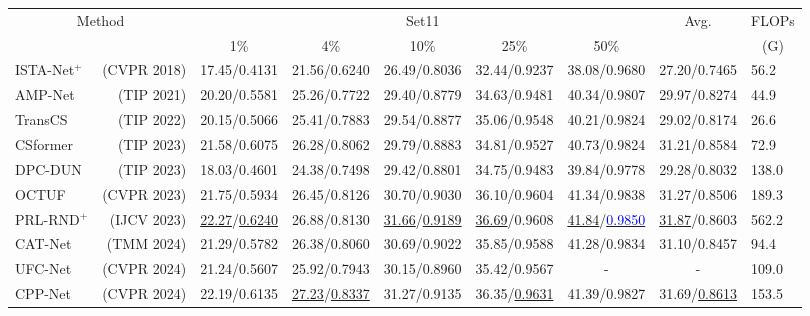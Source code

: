 \documentclass[10pt,twocolumn,letterpaper]{article}
\begin{document}
\begin{table}[th]
	\centering
	\begin{adjustbox}{width=\linewidth,center}
		\begin{tabular}{@{}lrccccccl@{}}
			\toprule
			\multicolumn{2}{c}{\multirow{2}{*}{Method}} & \multicolumn{5}{c}{Set11\cite{kulkarni2016reconnet}} & \multirow{2}{*}{Avg.} & \multicolumn{1}{c}{FLOPs} \\ \cmidrule(lr){3-7}
			\multicolumn{2}{c}{} & 1\% & 4\% & 10\% & 25\% & 50\% &  & \multicolumn{1}{c}{(G)} \\ \midrule
			ISTA-Net$^+$\cite{zhang2018ista} & (CVPR 2018) & 17.45/0.4131 & 21.56/0.6240 & 26.49/0.8036 & 32.44/0.9237 & 38.08/0.9680 & 27.20/0.7465 & 56.2 \\
			AMP-Net\cite{zhang2020amp} & (TIP 2021) & 20.20/0.5581 & 25.26/0.7722 & 29.40/0.8779 & 34.63/0.9481 & 40.34/0.9807 & 29.97/0.8274 & 44.9 \\
			TransCS\cite{shen2022transcs} & (TIP 2022) & 20.15/0.5066 & 25.41/0.7883 & 29.54/0.8877 & 35.06/0.9548 & 40.21/0.9824 & 29.02/0.8174 & 26.6 \\
			CSformer\cite{ye2021csformer} & (TIP 2023) & 21.58/0.6075 & 26.28/0.8062 & 29.79/0.8883 & 34.81/0.9527 & 40.73/0.9824 & 31.21/0.8584 & 72.9 \\
			DPC-DUN\cite{DBLP:journals/tip/SongCZ23} & (TIP 2023) & 18.03/0.4601 & 24.38/0.7498 & 29.42/0.8801 & 34.75/0.9483 & 39.84/0.9778 & 29.28/0.8032 & 138.0 \\
			OCTUF\cite{Song2023OptimizationInspiredCT} & (CVPR 2023) & 21.75/0.5934 & 26.45/0.8126 & 30.70/0.9030 & 36.10/0.9604 & 41.34/0.9838 & 31.27/0.8506 & 189.3 \\
			PRL-RND$^+$\cite{DBLP:journals/ijcv/ChenSXZ23} & (IJCV 2023) & \underline{22.27}/\underline{0.6240} & 26.88/0.8130 & \underline{31.66}/\underline{0.9189} & \underline{36.69}/0.9608 & \underline{41.84}/\underline{\textcolor{blue}{0.9850}} & \underline{31.87}/0.8603 & 562.2 \\
			CAT-Net\cite{DBLP:journals/tmm/KongCH24} & (TMM 2024) & 21.29/0.5782 & 26.38/0.8060 & 30.69/0.9022 & 35.85/0.9588 & 41.28/0.9834 & 31.10/0.8457 & 94.4 \\
			UFC-Net\cite{wangUFCNet2024} & (CVPR 2024) & 21.24/0.5607 & 25.92/0.7943 & 30.15/0.8960 & 35.42/0.9567 & - & - & 109.0 \\
			CPP-Net\cite{guoCPPNet2024} & (CVPR 2024) & 22.19/0.6135 & \underline{27.23}/\underline{0.8337} & 31.27/0.9135 & 36.35/\underline{0.9631} & 41.39/0.9827 & 31.69/\underline{0.8613} & 153.5 \\

\end{tabular}
\end{adjustbox}
\end{table}
\end{document}
